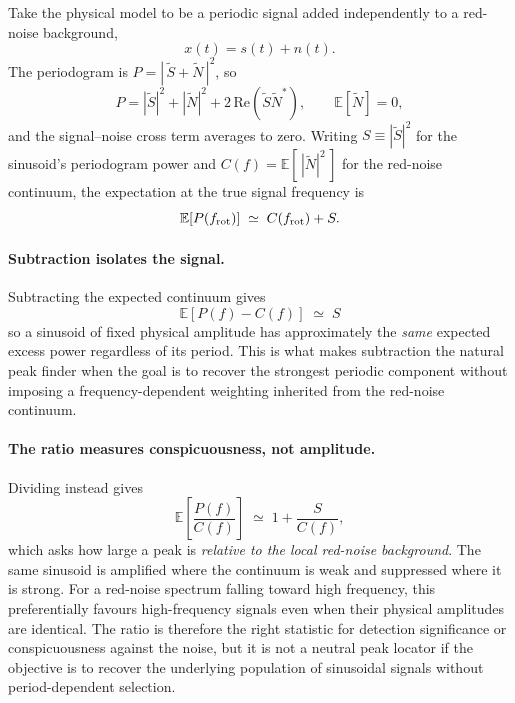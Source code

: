 \documentclass[11pt]{article}
\begin{document}
Take the physical model to be a periodic signal added independently to a red-noise
background,
%
\begin{equation}
  x(t) = s(t) + n(t) .
  \label{eq:additive}
\end{equation}
%
The periodogram is $P = |\,\tilde{S} + \tilde{N}\,|^{2}$, so
%
\begin{equation}
  P = |\tilde{S}|^{2} + |\tilde{N}|^{2} + 2\,\mathrm{Re}\!\left(\tilde{S}\tilde{N}^{*}\right),
  \qquad
  \mathbb{E}\!\left[\tilde{N}\right] = 0 ,
  \label{eq:expand}
\end{equation}
%
and the signal--noise cross term averages to zero. Writing $S \equiv |\tilde{S}|^{2}$ for
the sinusoid's periodogram power and $C(f) = \mathbb{E}[\,|\tilde{N}|^{2}\,]$ for the
red-noise continuum, the expectation at the true signal frequency is
%
\begin{equation}
  \mathbb{E}\!\left[P(f_{\rm rot})\right] \;\simeq\; C(f_{\rm rot}) + S .
  \label{eq:Eraw}
\end{equation}

\paragraph{Subtraction isolates the signal.}
Subtracting the expected continuum gives
%
\begin{equation}
  \boxed{\;\mathbb{E}\!\left[P(f) - C(f)\right] \;\simeq\; S\;}
  \label{eq:Ediff}
\end{equation}
%
so a sinusoid of fixed physical amplitude has approximately the \emph{same} expected
excess power regardless of its period. This is what makes subtraction the natural peak
finder when the goal is to recover the strongest periodic component without imposing a
frequency-dependent weighting inherited from the red-noise continuum.

\paragraph{The ratio measures conspicuousness, not amplitude.}
Dividing instead gives
%
\begin{equation}
  \mathbb{E}\!\left[\frac{P(f)}{C(f)}\right] \;\simeq\; 1 + \frac{S}{C(f)} ,
  \label{eq:Eratio}
\end{equation}
%
which asks how large a peak is \emph{relative to the local red-noise background}. The same
sinusoid is amplified where the continuum is weak and suppressed where it is strong. For a
red-noise spectrum falling toward high frequency, this preferentially favours
high-frequency signals even when their physical amplitudes are identical. The ratio is
therefore the right statistic for detection significance or conspicuousness against the
noise, but it is not a neutral peak locator if the objective is to recover the underlying
population of sinusoidal signals without period-dependent selection.
\end{document}
